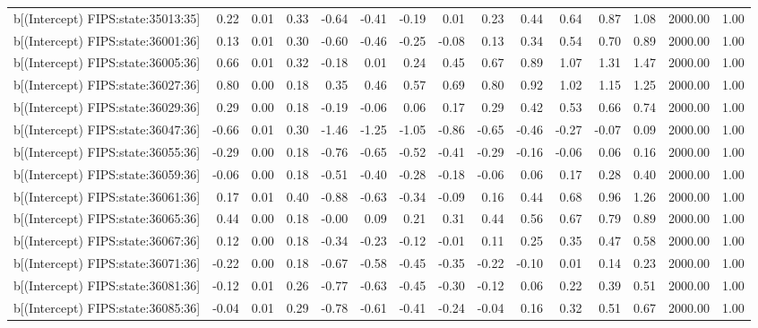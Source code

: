 \begin{table}[ht]
\begin{tabular}{rrrrrrrrrrrrrrr}
  b[(Intercept) FIPS:state:35013:35] & 0.22 & 0.01 & 0.33 & -0.64 & -0.41 & -0.19 & 0.01 & 0.23 & 0.44 & 0.64 & 0.87 & 1.08 & 2000.00 & 1.00 \\ 
  b[(Intercept) FIPS:state:36001:36] & 0.13 & 0.01 & 0.30 & -0.60 & -0.46 & -0.25 & -0.08 & 0.13 & 0.34 & 0.54 & 0.70 & 0.89 & 2000.00 & 1.00 \\ 
  b[(Intercept) FIPS:state:36005:36] & 0.66 & 0.01 & 0.32 & -0.18 & 0.01 & 0.24 & 0.45 & 0.67 & 0.89 & 1.07 & 1.31 & 1.47 & 2000.00 & 1.00 \\ 
  b[(Intercept) FIPS:state:36027:36] & 0.80 & 0.00 & 0.18 & 0.35 & 0.46 & 0.57 & 0.69 & 0.80 & 0.92 & 1.02 & 1.15 & 1.25 & 2000.00 & 1.00 \\ 
  b[(Intercept) FIPS:state:36029:36] & 0.29 & 0.00 & 0.18 & -0.19 & -0.06 & 0.06 & 0.17 & 0.29 & 0.42 & 0.53 & 0.66 & 0.74 & 2000.00 & 1.00 \\ 
  b[(Intercept) FIPS:state:36047:36] & -0.66 & 0.01 & 0.30 & -1.46 & -1.25 & -1.05 & -0.86 & -0.65 & -0.46 & -0.27 & -0.07 & 0.09 & 2000.00 & 1.00 \\ 
  b[(Intercept) FIPS:state:36055:36] & -0.29 & 0.00 & 0.18 & -0.76 & -0.65 & -0.52 & -0.41 & -0.29 & -0.16 & -0.06 & 0.06 & 0.16 & 2000.00 & 1.00 \\ 
  b[(Intercept) FIPS:state:36059:36] & -0.06 & 0.00 & 0.18 & -0.51 & -0.40 & -0.28 & -0.18 & -0.06 & 0.06 & 0.17 & 0.28 & 0.40 & 2000.00 & 1.00 \\ 
  b[(Intercept) FIPS:state:36061:36] & 0.17 & 0.01 & 0.40 & -0.88 & -0.63 & -0.34 & -0.09 & 0.16 & 0.44 & 0.68 & 0.96 & 1.26 & 2000.00 & 1.00 \\ 
  b[(Intercept) FIPS:state:36065:36] & 0.44 & 0.00 & 0.18 & -0.00 & 0.09 & 0.21 & 0.31 & 0.44 & 0.56 & 0.67 & 0.79 & 0.89 & 2000.00 & 1.00 \\ 
  b[(Intercept) FIPS:state:36067:36] & 0.12 & 0.00 & 0.18 & -0.34 & -0.23 & -0.12 & -0.01 & 0.11 & 0.25 & 0.35 & 0.47 & 0.58 & 2000.00 & 1.00 \\ 
  b[(Intercept) FIPS:state:36071:36] & -0.22 & 0.00 & 0.18 & -0.67 & -0.58 & -0.45 & -0.35 & -0.22 & -0.10 & 0.01 & 0.14 & 0.23 & 2000.00 & 1.00 \\ 
  b[(Intercept) FIPS:state:36081:36] & -0.12 & 0.01 & 0.26 & -0.77 & -0.63 & -0.45 & -0.30 & -0.12 & 0.06 & 0.22 & 0.39 & 0.51 & 2000.00 & 1.00 \\ 
  b[(Intercept) FIPS:state:36085:36] & -0.04 & 0.01 & 0.29 & -0.78 & -0.61 & -0.41 & -0.24 & -0.04 & 0.16 & 0.32 & 0.51 & 0.67 & 2000.00 & 1.00 \\ 

\end{tabular}
\end{table}
